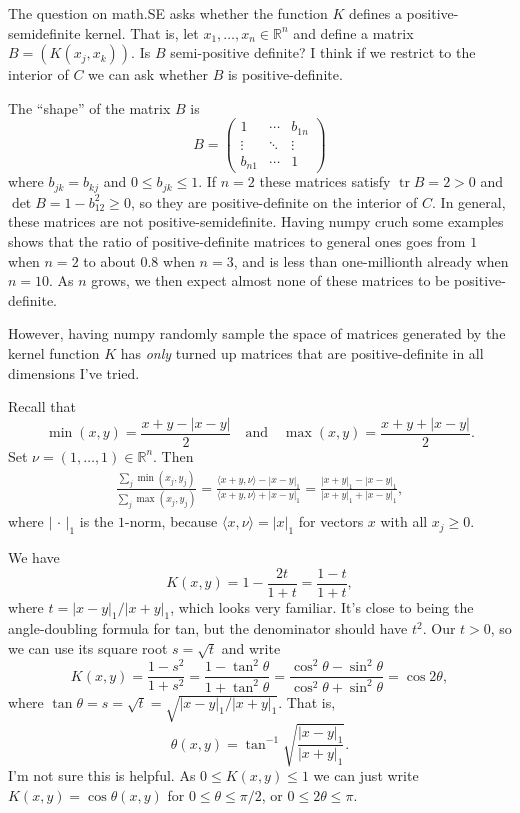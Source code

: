 \documentclass[11pt]{article}
\theoremstyle{definition}
\newcommand{\kk}[1]{\mathbb{#1}}
\def\qandq{\quad\text{and}\quad}
\DeclareMathOperator{\tr}{tr}
\begin{document}
The question on math.SE asks whether the function $K$ defines a positive-semidefinite kernel. That is, let $x_1, \ldots, x_n \in \kk R^n$ and define a matrix $B = (K(x_j,x_k))$. Is $B$ semi-positive definite? I think if we restrict to the interior of $C$ we can ask whether $B$ is positive-definite.

The ``shape'' of the matrix $B$ is
\[
B =
\begin{pmatrix}
1  & \cdots & b_{1n}
\\
\vdots & \ddots & \vdots
\\
b_{n1} & \cdots & 1
\end{pmatrix}
\]
where $b_{jk} = b_{kj}$ and $0 \leq b_{jk} \leq 1$. If $n = 2$ these matrices satisfy $\tr B = 2 > 0$ and $\det B = 1 - b_{12}^2 \geq 0$, so they are positive-definite on the interior of $C$. In general, these matrices are not positive-semidefinite. Having numpy cruch some examples shows that the ratio of positive-definite matrices to general ones goes from $1$ when $n = 2$ to about $0.8$ when $n = 3$, and is less than one-millionth already when $n = 10$. As $n$ grows, we then expect almost none of these matrices to be positive-definite.

However, having numpy randomly sample the space of matrices generated by the kernel function $K$ has \emph{only} turned up matrices that are positive-definite in all dimensions I've tried.

Recall that
\[
\min(x,y) = \frac{x + y - |x - y|}{2}
\qandq
\max(x,y) = \frac{x + y + |x - y|}{2}.
\]
Set $\nu = (1,\ldots,1) \in \kk R^n$. Then
\begin{align*}
\frac{\sum_j \min(x_j,y_j)}{\sum_j \max(x_j,y_j)}
= \frac{\langle x + y, \nu \rangle - |x-y|_1}{\langle x + y, \nu \rangle + |x-y|_1}
= \frac{|x+y|_1 - |x-y|_1}{|x+y|_1 + |x-y|_1},
\end{align*}
where $|\,\cdot\,|_1$ is the $1$-norm, because $\langle x, \nu \rangle = |x|_1$ for vectors $x$ with all $x_j \geq 0$.

We have
\[
K(x,y)
= 1 - \frac{2 t}{1 + t} = \frac{1-t}{1+t},
\]
where $t = |x-y|_1/|x+y|_1$, which looks very familiar. It's close to being the angle-doubling formula for tan, but the denominator should have $t^2$. Our $t > 0$, so we can use its square root $s = \sqrt t$ and write
\[
K(x,y) = \frac{1-s^2}{1+s^2}
= \frac{1-\tan^2 \theta}{1 + \tan^2 \theta}
= \frac{\cos^2\theta - \sin^2\theta}{\cos^2\theta + \sin^2 \theta}
= \cos 2\theta,
\]
where $\tan \theta = s = \sqrt t = \sqrt{|x-y|_1 / |x+y|_1}$.
That is,
\[
\theta(x,y) = \tan^{-1} \sqrt{\frac{|x-y|_1}{|x+y|_1}}.
\]
I'm not sure this is helpful. As $0 \leq K(x,y) \leq 1$ we can just write $K(x,y) = \cos \theta(x,y)$ for $0 \leq \theta \leq \pi/2$, or $0 \leq 2\theta \leq \pi$.
\end{document}
